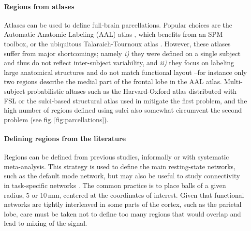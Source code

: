 \documentclass[5p]{elsarticle}
\begin{document}
\paragraph{Regions from atlases}
%
Atlases can be used to define full-brain parcellations. Popular
choices are the Automatic Anatomic Labeling (AAL) atlas \cite{tzourio-mazoyer2002a}, 
which benefits from an SPM toolbox, or the ubiquitous Talaraich-Tournoux
atlas \cite{talairach1988}. 
However, these atlases suffer from major
shortcomings; namely \emph{i)} they were defined on a single subject
and thus do not reflect inter-subject variability, and \emph{ii)}
they focus on labeling large anatomical structures and do not match
functional layout --for instance only two regions describe the medial
part of the frontal lobe in the AAL atlas. Multi-subject probabilistic altases such as the
Harvard-Oxford atlas distributed with FSL \cite{smith2004} or the
sulci-based structural atlas used in \cite{varoquaux2010c} mitigate the
first problem, and the high number of regions defined using sulci also
somewhat circumvent the second problem (see fig.\,\ref{fig:parcellations}).

\paragraph{Defining regions from the literature}
%
Regions can be defined from previous studies, informally or with
systematic meta-analysis. This strategy is used to define the main
resting-state networks, such as the default mode network, but may also be
useful to study connectivity in task-specific networks
\cite{biswal1995,rissman2004,dosenbach2006,grillon2012}. The common practice is to place balls of a given
radius, 5 or 10\,mm, centered at the coordinates of interest. Given that
functional networks are tightly interleaved in some parts of the cortex,
such as the parietal lobe, care must be taken not to define too many
regions that would overlap and lead to mixing of the signal.
\end{document}
